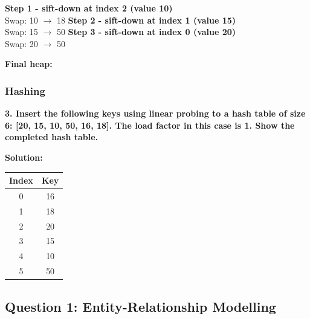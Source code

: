 \textbf{Step 1 - sift-down at index 2 (value 10)} \\
Swap: 10 $\rightarrow$ 18
\textbf{Step 2 - sift-down at index 1 (value 15)} \\
Swap: 15 $\rightarrow$ 50
\textbf{Step 3 - sift-down at index 0 (value 20)} \\
Swap: 20 $\rightarrow$ 50

\textbf{Final heap:}

\begin{center}
\end{center}

\subsubsection{Hashing}
\textbf{3. Insert the following keys using linear probing to a hash table of size 6: [20, 15, 10, 50, 16, 18]. The load factor in this case is 1. Show the completed hash table.}

\textbf{Solution:}

\begin{center}
\begin{tabular}{|c|c|}
\hline
\textbf{Index} & \textbf{Key} \\
\hline
0 & 16 \\
\hline
1 & 18 \\
\hline
2 & 20 \\
\hline
3 & 15 \\
\hline
4 & 10 \\
\hline
5 & 50 \\
\hline
\end{tabular}
\end{center}





\subsection{Question 1: Entity-Relationship Modelling}

